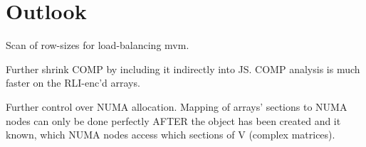 \chapter{Outlook}

Scan of row-sizes for load-balancing mvm.

Further shrink COMP by including it indirectly into JS. COMP analysis is much faster on the RLI-enc'd arrays.

Further control over NUMA allocation. Mapping of arrays' sections to NUMA nodes can only be done perfectly AFTER the
object has been created and it known, which NUMA nodes access which sections of V (complex matrices).
